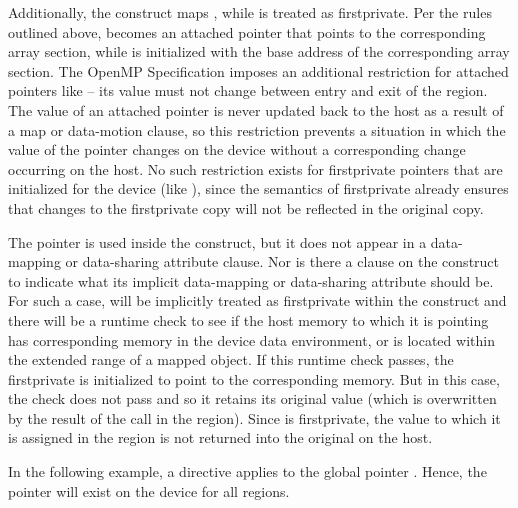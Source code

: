 Additionally, the construct maps , while  is treated as
firstprivate. Per the rules outlined above,  becomes an attached
pointer that points to the corresponding  array section, while
 is initialized with the base address of the corresponding
 array section. The OpenMP Specification imposes an additional restriction for
attached pointers like  -- its value must not change between entry
and exit of the  region. The value of an attached pointer is
never updated back to the host as a result of a map or data-motion clause, so
this restriction prevents a situation in which the value of the pointer changes
on the device without a corresponding change occurring on the host. No such
restriction exists for firstprivate pointers that are initialized for the
device (like ), since the semantics of firstprivate already ensures
that changes to the firstprivate copy will not be reflected in the original
copy.

The pointer  is used inside the  construct, but it does
not appear in a data-mapping or data-sharing attribute clause. Nor is there a
 clause on the construct to indicate what its implicit
data-mapping or data-sharing attribute should be. For such a case, 
will be implicitly treated as firstprivate within the construct and there will
be a runtime check to see if the host memory to which it is pointing has
corresponding memory in the device data environment, or is located within the
extended range of a mapped object. If this runtime check passes, the firstprivate
 is initialized to point to the corresponding memory. But in this
case, the check does not pass and so it retains its original value (which is
overwritten by the result of the  call in the 
region). Since  is firstprivate, the value to which it is assigned
in the  region is not returned into the original  on
the host.



In the following example, a  directive applies to the global
pointer .  Hence, the pointer  will exist on the device
for all  regions.

